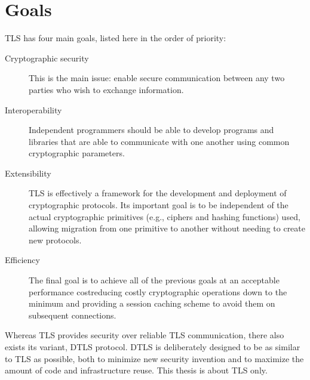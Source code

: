 \section{Goals}

TLS has four main goals, listed here in the order of priority:

\begin{description}
  \item[Cryptographic security] This is the main issue: enable secure communication between any two parties who wish to exchange information.
  \item[Interoperability] Independent programmers should be able to develop programs and libraries that are able to communicate with one another using common cryptographic parameters.
  \item[Extensibility] TLS is effectively a framework for the development and deployment of cryptographic protocols. Its important goal is to be independent of the actual cryptographic primitives (e.g., ciphers and hashing functions) used, allowing migration from one primitive to another without needing to create new protocols.
  \item[Efficiency] The final goal is to achieve all of the previous goals at an acceptable performance costreducing costly cryptographic operations down to the minimum and providing a session caching scheme to avoid them on subsequent connections. \cite[p.~2]{ristic2014bulletproof}
\end{description}

Whereas TLS provides security over reliable TLS communication, there also exists its variant, DTLS protocol. DTLS is deliberately designed to be as similar to TLS as possible, both to minimize new security invention and to maximize the amount of code and infrastructure reuse.\cite[p.~4]{rfc6347} This thesis is about TLS only.
